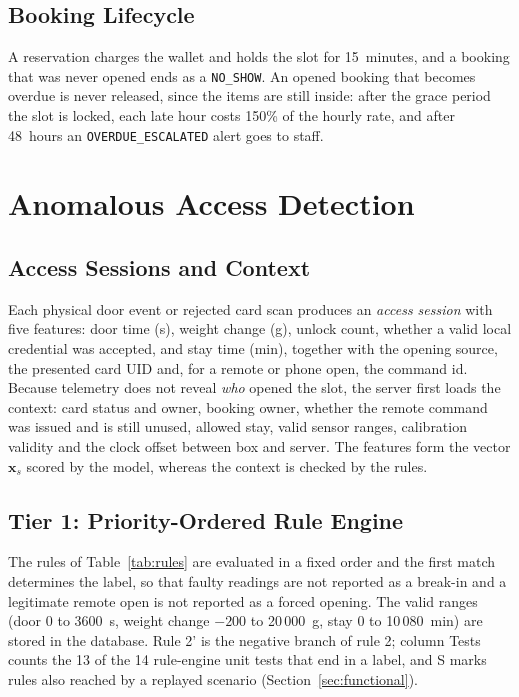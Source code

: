 \documentclass[manuscript,screen]{acmart}
\begin{document}
\subsection{Booking Lifecycle}

A reservation charges the wallet and holds the slot for 15~minutes, and a booking that was never opened ends as a
\texttt{NO\_SHOW}. An opened booking that becomes overdue is never released, since the items are still inside: after
the grace period the slot is locked, each late hour costs 150\% of the hourly rate, and after 48~hours an
\texttt{OVERDUE\_ESCALATED} alert goes to staff.

\section{Anomalous Access Detection}\label{sec:detector}

\subsection{Access Sessions and Context}\label{sec:sessions}

Each physical door event or rejected card scan produces an \emph{access session} with five features: door time (s),
weight change (g), unlock count, whether a valid local credential was accepted, and stay time (min), together with the
opening source, the presented card UID and, for a remote or phone open, the command id. Because telemetry does not
reveal \emph{who} opened the slot, the server first loads the context: card status and owner, booking owner, whether the
remote command was issued and is still unused, allowed stay, valid sensor ranges, calibration validity and the clock
offset between box and server. The features form the vector $\mathbf{x}_s$ scored by the model, whereas the context is
checked by the rules.

\subsection{Tier 1: Priority-Ordered Rule Engine}

The rules of Table~\ref{tab:rules} are evaluated in a fixed order and the first match determines the label, so that
faulty readings are not reported as a break-in and a legitimate remote open is not reported as a forced opening. The
valid ranges (door 0 to 3600~s, weight change $-200$ to 20\,000~g, stay 0 to 10\,080~min) are stored in the database. Rule 2'
is the negative branch of rule 2; column Tests counts the 13 of the 14 rule-engine unit tests that end in a label, and
S marks rules also reached by a replayed scenario (Section~\ref{sec:functional}).
\end{document}
